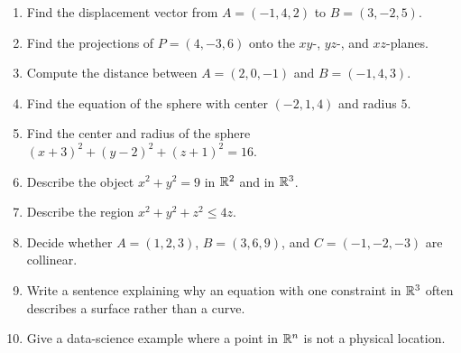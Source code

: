 \begin{enumerate}
  \item Find the displacement vector from $A=(-1,4,2)$ to $B=(3,-2,5)$.
  \item Find the projections of $P=(4,-3,6)$ onto the $xy$-, $yz$-, and $xz$-planes.
  \item Compute the distance between $A=(2,0,-1)$ and $B=(-1,4,3)$.
  \item Find the equation of the sphere with center $(-2,1,4)$ and radius $5$.
  \item Find the center and radius of the sphere $(x+3)^2+(y-2)^2+(z+1)^2=16$.
  \item Describe the object $x^2+y^2=9$ in $\mathbb{R}^2$ and in $\mathbb{R}^3$.
  \item Describe the region $x^2+y^2+z^2\le 4z$.
  \item Decide whether $A=(1,2,3)$, $B=(3,6,9)$, and $C=(-1,-2,-3)$ are collinear.
  \item Write a sentence explaining why an equation with one constraint in $\mathbb{R}^3$ often describes a surface rather than a curve.
  \item Give a data-science example where a point in $\mathbb{R}^n$ is not a physical location.
\end{enumerate}


